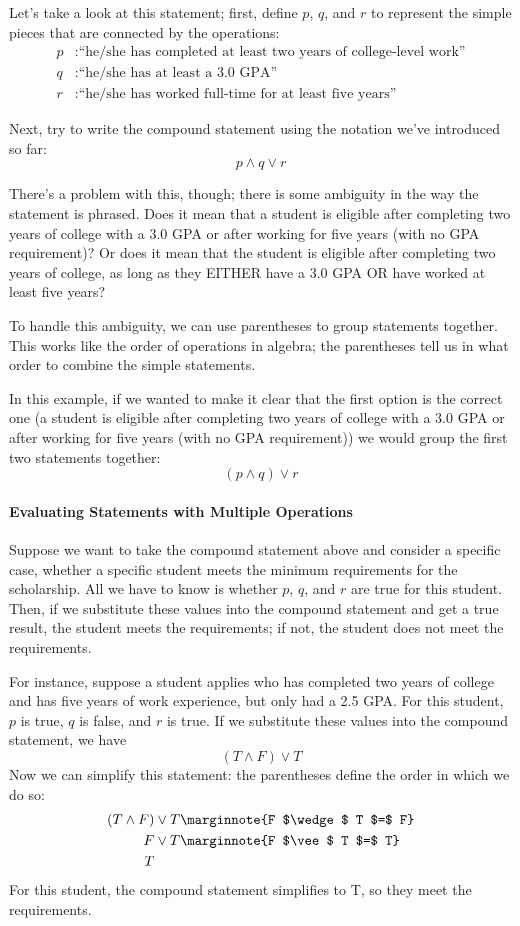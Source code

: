 Let's take a look at this statement; first, define $p$, $q$, and $r$ to represent the simple pieces that are connected by the operations:
\begin{align*}
p &: \textrm{``he/she has completed at least two years of college-level work''}\\
q &: \textrm{``he/she has at least a 3.0 GPA''}\\
r &: \textrm{``he/she has worked full-time for at least five years''}
\end{align*}

Next, try to write the compound statement using the notation we've introduced so far:
\[p \wedge q \vee r\]

There's a problem with this, though; there is some ambiguity in the way the statement is phrased.  Does it mean that a student is eligible after completing two years of college with a 3.0 GPA or after working for five years (with no GPA requirement)?  Or does it mean that the student is eligible after completing two years of college, as long as they EITHER have a 3.0 GPA OR have worked at least five years?

To handle this ambiguity, we can use parentheses to group statements together.  This works like the order of operations in algebra; the parentheses tell us in what order to combine the simple statements.

In this example, if we wanted to make it clear that the first option is the correct one (a student is eligible after completing two years of college with a 3.0 GPA or after working for five years (with no GPA requirement)) we would group the first two statements together:
\[(p \wedge q) \vee r\]

\paragraph{Evaluating Statements with Multiple Operations}
Suppose we want to take the compound statement above and consider a specific case, whether a specific student meets the minimum requirements for the scholarship.  All we have to know is whether $p$, $q$, and $r$ are true for this student.  Then, if we substitute these values into the compound statement and get a true result, the student meets the requirements; if not, the student does not meet the requirements.

For instance, suppose a student applies who has completed two years of college and has five years of work experience, but only had a 2.5 GPA.  For this student, $p$ is true, $q$ is false, and $r$ is true.  If we substitute these values into the compound statement, we have
\[(T \wedge F) \vee T\]
Now we can simplify this statement: the parentheses define the order in which we do so:
\begin{align*}
(T \wedge F) &\vee T\marginnote{F $\wedge$ T $=$ F}\\
F &\vee T\marginnote{F $\vee$ T $=$ T}\\
T
\end{align*}
For this student, the compound statement simplifies to T, so they meet the requirements.
\pagebreak

